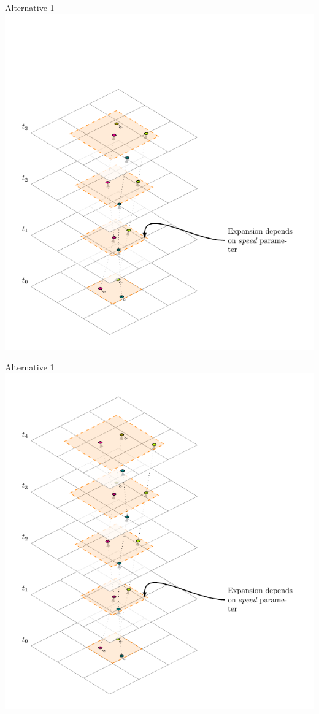 \documentclass{beamer}
\begin{document}
\begin{frame}{Alternative 1}
    \centering
    \includegraphics[height=0.95\textheight]{Figures/A1/T3}
\end{frame}
\begin{frame}{Alternative 1}
    \centering
    \includegraphics[height=0.95\textheight]{Figures/A1/T4}
\end{frame}
\end{document}
